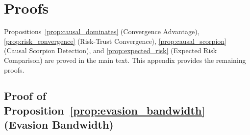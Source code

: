 \section{Proofs}
\label{app:proofs}

Propositions~\ref{prop:causal_dominates} (Convergence Advantage),
\ref{prop:risk_convergence} (Risk-Trust Convergence),
\ref{prop:causal_scorpion} (Causal Scorpion Detection), and
\ref{prop:expected_risk} (Expected Risk Comparison) are proved in the main
text. This appendix provides the remaining proofs.

\subsection{Proof of Proposition~\ref{prop:evasion_bandwidth}
    (Evasion Bandwidth)}
\label{app:proof_evasion}

